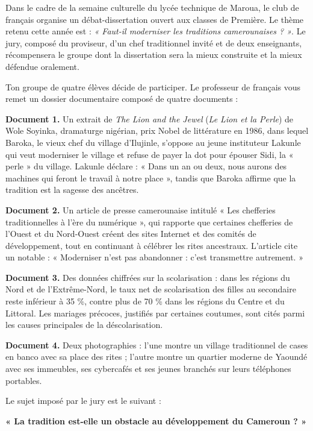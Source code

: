 \documentclass[11pt]{article}
\newcommand{\cle}[1]{{\popxbold\color{popdark}#1}}
\newcounter{popsec}
\newcounter{popsub}
\newcommand{\courssub}[1]{%
  \stepcounter{popsub}%
  \par\vspace{9pt}\noindent{\popxbold\fontsize{11.5}{13}\selectfont\color{popink}{\color{poporange}\thepopsec.\thepopsub}\hspace{6pt}#1}\par\nopagebreak\vspace{4pt}
}
\begin{document}
\courssub{Situation}

Dans le cadre de la semaine culturelle du lycée technique de Maroua, le club de français organise un \cle{débat-dissertation} ouvert aux classes de Première. Le thème retenu cette année est : \emph{« Faut-il moderniser les traditions camerounaises ? »}. Le jury, composé du proviseur, d'un chef traditionnel invité et de deux enseignants, récompensera le groupe dont la dissertation sera la mieux construite et la mieux défendue oralement.

Ton groupe de quatre élèves décide de participer. Le professeur de français vous remet un dossier documentaire composé de quatre documents :

\textbf{Document 1.} Un extrait de \emph{The Lion and the Jewel} (\emph{Le Lion et la Perle}) de Wole Soyinka, dramaturge nigérian, prix Nobel de littérature en 1986, dans lequel Baroka, le vieux chef du village d'Ilujinle, s'oppose au jeune instituteur Lakunle qui veut moderniser le village et refuse de payer la dot pour épouser Sidi, la « perle » du village. Lakunle déclare : « Dans un an ou deux, nous aurons des machines qui feront le travail à notre place », tandis que Baroka affirme que la tradition est la sagesse des ancêtres.

\textbf{Document 2.} Un article de presse camerounaise intitulé « Les chefferies traditionnelles à l'ère du numérique », qui rapporte que certaines chefferies de l'Ouest et du Nord-Ouest créent des sites Internet et des comités de développement, tout en continuant à célébrer les rites ancestraux. L'article cite un notable : « Moderniser n'est pas abandonner : c'est transmettre autrement. »

\textbf{Document 3.} Des données chiffrées sur la scolarisation : dans les régions du Nord et de l'Extrême-Nord, le taux net de scolarisation des filles au secondaire reste inférieur à 35 \%, contre plus de 70 \% dans les régions du Centre et du Littoral. Les mariages précoces, justifiés par certaines coutumes, sont cités parmi les causes principales de la déscolarisation.

\textbf{Document 4.} Deux photographies : l'une montre un village traditionnel de cases en banco avec sa place des rites ; l'autre montre un quartier moderne de Yaoundé avec ses immeubles, ses cybercafés et ses jeunes branchés sur leurs téléphones portables.

Le sujet imposé par le jury est le suivant :

\begin{center}
\textbf{« La tradition est-elle un obstacle au développement du Cameroun ? »}
\end{center}
\end{document}
